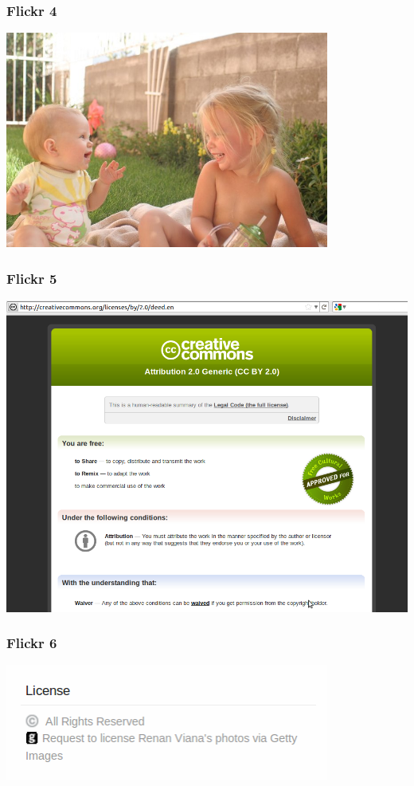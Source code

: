 \documentclass[mathserif,xcolor=dvipsnames,hyperref={bookmarks=true}]{beamer}
\begin{document}
    \begin{frame}[t]
        \frametitle{Flickr 4}
        \begin{center}
            \includegraphics[width=0.8\textwidth]{katherine-and-evelyn.jpg}
        \end{center}
    \end{frame}
    \begin{frame}[t]
        \frametitle{Flickr 5}
        \begin{center}
            \includegraphics[height=0.8\textheight]{link-to-cc-license-from-flickr.png}
        \end{center}
    \end{frame}
    \begin{frame}[t]
        \frametitle{Flickr 6}
        \begin{center}
            \includegraphics[width=0.8\textwidth]{request-to-license1.png}
        \end{center}
    \end{frame}
\end{document}
